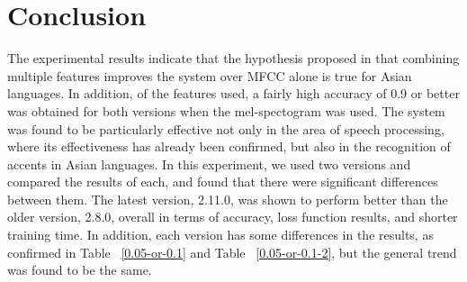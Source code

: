 \documentclass[ams]{U-AizuGT}
\begin{document}
\section{Conclusion}
\label{sec:conclusion}
The experimental results indicate that the hypothesis proposed in \cite{Singh:fea} that combining multiple features improves the system over MFCC alone is true for Asian languages. In addition, of the features used, a fairly high accuracy of 0.9 or better was obtained for both versions when the mel-spectogram was used. The system was found to be particularly effective not only in the area of speech processing, where its effectiveness has already been confirmed, but also in the recognition of accents in Asian languages.
In this experiment, we used two versions and compared the results of each, and found that there were significant differences between them. The latest version, 2.11.0, was shown to perform better than the older version, 2.8.0, overall in terms of accuracy, loss function results, and shorter training time. In addition, each version has some differences in the results, as confirmed in Table ~\ref{0.05-or-0.1} and Table ~\ref{0.05-or-0.1-2}, but the general trend was found to be the same.

\end{document}
